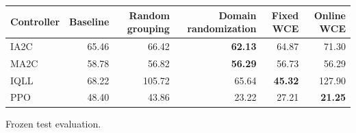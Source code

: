 \begin{tabular}{lrrrrr}
\hline
Controller & Baseline & Random grouping & Domain randomization & Fixed WCE & Online WCE \\
\hline
IA2C & 65.46 & 66.42 & \textbf{62.13} & 64.87 & 71.30 \\
MA2C & 58.78 & 56.82 & \textbf{56.29} & 56.73 & 56.29 \\
IQLL & 68.22 & 105.72 & 65.64 & \textbf{45.32} & 127.90 \\
PPO & 48.40 & 43.86 & 23.22 & 27.21 & \textbf{21.25} \\
\hline
\end{tabular}
Frozen test evaluation.
